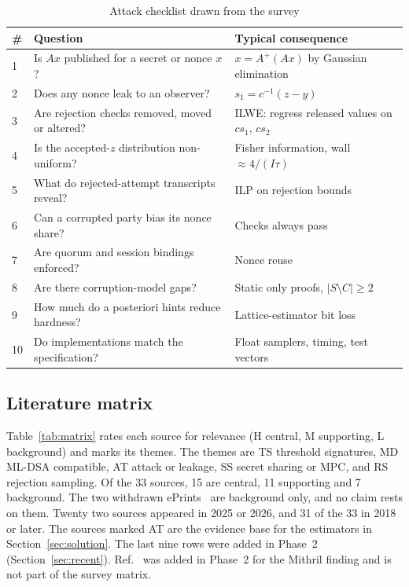 \documentclass[10pt,conference,a4paper]{IEEEtran}
\begin{document}
\begin{table}[t]
\caption{Attack checklist drawn from the survey}\label{tab:checklist}
\centering\footnotesize
\begin{tabularx}{\columnwidth}{@{}lXX@{}}
\toprule
\# & Question & Typical consequence\\
\midrule
1 & Is $Ax$ published for a secret or nonce $x$? & $x=A^{+}(Ax)$ by Gaussian elimination\\
2 & Does any nonce leak to an observer? & $s_1=c^{-1}(z-y)$\\
3 & Are rejection checks removed, moved or altered? & ILWE: regress released values on $cs_1$, $cs_2$\\
4 & Is the accepted-$z$ distribution non-uniform? & Fisher information, wall $\approx4/(I\tau)$\\
5 & What do rejected-attempt transcripts reveal? & ILP on rejection bounds~\cite{rejected}\\
6 & Can a corrupted party bias its nonce share? & Checks always pass\\
7 & Are quorum and session bindings enforced? & Nonce reuse\\
8 & Are there corruption-model gaps? & Static only proofs, $|S\setminus C|\ge2$\\
9 & How much do a posteriori hints reduce hardness? & Lattice-estimator bit loss\\
10 & Do implementations match the specification? & Float samplers, timing, test vectors\\
\bottomrule
\end{tabularx}
\end{table}

\subsection{Literature matrix}
Table~\ref{tab:matrix} rates each source for relevance (H central, M supporting, L background) and marks its themes. The
themes are TS threshold signatures, MD ML-DSA compatible, AT attack or leakage, SS secret sharing or MPC, and RS rejection
sampling. Of the 33 sources, 15 are central, 11 supporting and 7 background. The two withdrawn
ePrints~\cite{reloaded,dpia} are background only, and no claim rests on them. Twenty two sources appeared in 2025 or 2026,
and 31 of the 33 in 2018 or later. The sources marked AT are the evidence base for the estimators in
Section~\ref{sec:solution}. The last nine rows were added in Phase~2 (Section~\ref{sec:recent}). Ref.~\cite{devevey} was
added in Phase~2 for the Mithril finding and is not part of the survey matrix.
\end{document}

